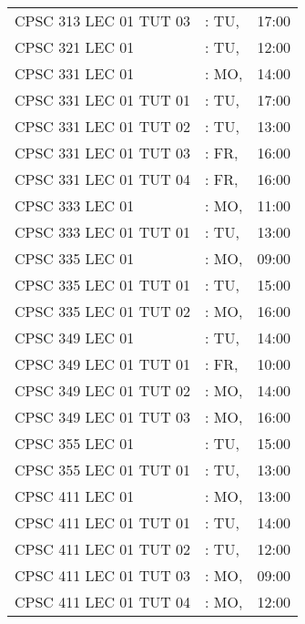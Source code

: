 \documentclass[11pt]{article}
\begin{document}
\begin{longtable}{l l r}
CPSC 313 LEC 01 TUT 03        &\hspace*{1.5cm}:  TU,& 17:00\tabularnewline
CPSC 321 LEC 01               &\hspace*{1.5cm}:  TU,& 12:00\tabularnewline
CPSC 331 LEC 01               &\hspace*{1.5cm}:  MO,& 14:00\tabularnewline
CPSC 331 LEC 01 TUT 01        &\hspace*{1.5cm}:  TU,& 17:00\tabularnewline
CPSC 331 LEC 01 TUT 02        &\hspace*{1.5cm}:  TU,& 13:00\tabularnewline
CPSC 331 LEC 01 TUT 03        &\hspace*{1.5cm}:  FR,& 16:00\tabularnewline
CPSC 331 LEC 01 TUT 04        &\hspace*{1.5cm}:  FR,& 16:00\tabularnewline
CPSC 333 LEC 01               &\hspace*{1.5cm}:  MO,& 11:00\tabularnewline
CPSC 333 LEC 01 TUT 01        &\hspace*{1.5cm}:  TU,& 13:00\tabularnewline
CPSC 335 LEC 01               &\hspace*{1.5cm}:  MO,& 09:00\tabularnewline
CPSC 335 LEC 01 TUT 01        &\hspace*{1.5cm}:  TU,& 15:00\tabularnewline
CPSC 335 LEC 01 TUT 02        &\hspace*{1.5cm}:  MO,& 16:00\tabularnewline
CPSC 349 LEC 01               &\hspace*{1.5cm}:  TU,& 14:00\tabularnewline
CPSC 349 LEC 01 TUT 01        &\hspace*{1.5cm}:  FR,& 10:00\tabularnewline
CPSC 349 LEC 01 TUT 02        &\hspace*{1.5cm}:  MO,& 14:00\tabularnewline
CPSC 349 LEC 01 TUT 03        &\hspace*{1.5cm}:  MO,& 16:00\tabularnewline
CPSC 355 LEC 01               &\hspace*{1.5cm}:  TU,& 15:00\tabularnewline
CPSC 355 LEC 01 TUT 01        &\hspace*{1.5cm}:  TU,& 13:00\tabularnewline
CPSC 411 LEC 01               &\hspace*{1.5cm}:  MO,& 13:00\tabularnewline
CPSC 411 LEC 01 TUT 01        &\hspace*{1.5cm}:  TU,& 14:00\tabularnewline
CPSC 411 LEC 01 TUT 02        &\hspace*{1.5cm}:  TU,& 12:00\tabularnewline
CPSC 411 LEC 01 TUT 03        &\hspace*{1.5cm}:  MO,& 09:00\tabularnewline
CPSC 411 LEC 01 TUT 04        &\hspace*{1.5cm}:  MO,& 12:00\tabularnewline

\end{longtable}
\end{document}

